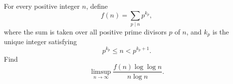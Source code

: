 For every positive integer $n$, define
$$f(n)=\sum_{p\mid n}{p^{k_p}},$$where the sum is taken over all positive prime divisors $p$ of $n$, and $k_p$ is the unique integer satisfying $$p^{k_p}\leqslant n<p^{k_p+1}.$$Find$$\limsup_{n\to \infty} \frac{f(n)\log \log n}{n\log n} .$$